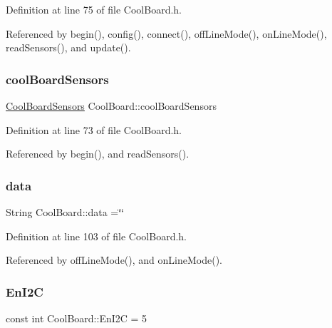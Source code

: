 Definition at line 75 of file Cool\+Board.\+h.



Referenced by begin(), config(), connect(), off\+Line\+Mode(), on\+Line\+Mode(), read\+Sensors(), and update().

\mbox{\label{classCoolBoard_af102be5288bd7f7a8e59b13f86e26a00}} 
\subsubsection{\texorpdfstring{cool\+Board\+Sensors}{coolBoardSensors}}
{\footnotesize\ttfamily \hyperlink{classCoolBoardSensors}{Cool\+Board\+Sensors} Cool\+Board\+::cool\+Board\+Sensors\hspace{0.3cm}{\ttfamily [private]}}



Definition at line 73 of file Cool\+Board.\+h.



Referenced by begin(), and read\+Sensors().

\mbox{\label{classCoolBoard_a427fb753dd8575bdf821c70a5c63d695}} 
\subsubsection{\texorpdfstring{data}{data}}
{\footnotesize\ttfamily String Cool\+Board\+::data =\char`\"{}\char`\"{}\hspace{0.3cm}{\ttfamily [private]}}



Definition at line 103 of file Cool\+Board.\+h.



Referenced by off\+Line\+Mode(), and on\+Line\+Mode().

\mbox{\label{classCoolBoard_af1fe1376fc66f93dee80b327ca695377}} 
\subsubsection{\texorpdfstring{En\+I2C}{EnI2C}}
{\footnotesize\ttfamily const int Cool\+Board\+::\+En\+I2C = 5\hspace{0.3cm}{\ttfamily [private]}}



